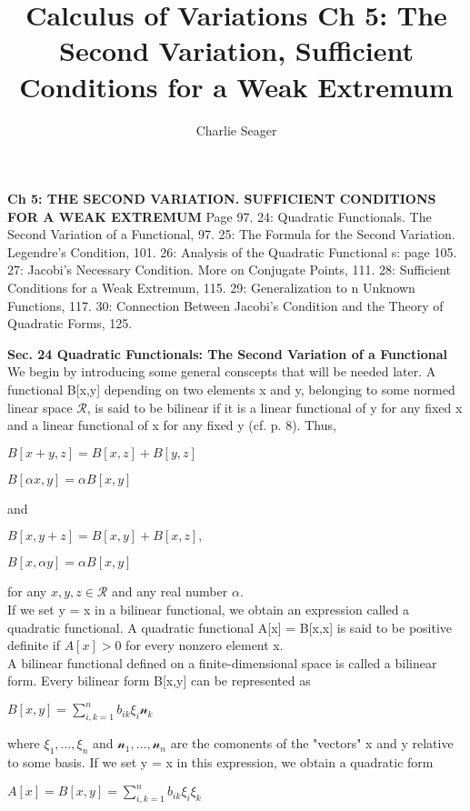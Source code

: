 \documentclass{article}
\begin{document}
\title {Calculus of Variations Ch 5: The Second Variation, Sufficient Conditions for a Weak Extremum}

\author{Charlie Seager}

\maketitle

\textbf {Ch 5: THE SECOND VARIATION. SUFFICIENT CONDITIONS FOR A WEAK EXTREMUM} Page 97. 24: Quadratic Functionals. The Second Variation of a Functional, 97. 25: The Formula for the Second Variation. Legendre's Condition, 101. 26: Analysis of the Quadratic Functional s: page 105. 27: Jacobi's Necessary Condition. More on Conjugate Points, 111. 28: Sufficient Conditions for a Weak Extremum, 115. 29: Generalization to n Unknown Functions, 117. 30: Connection Between Jacobi's Condition and the Theory of Quadratic Forms, 125.

\textbf {Sec. 24 Quadratic Functionals: The Second Variation of a Functional} \\ We begin by introducing some general conscepts that will be needed later. A functional B[x,y] depending on two elements x and y, belonging to some normed linear space $\mathcal{R}$, is said to be bilinear if it is a linear functional of y for any fixed x and a linear functional of x for any fixed y (cf. p. 8). Thus,
\begin{center}
$B[x + y, z] = B[x, z] + B[y,z]$
\end{center}
\begin{center}
$B[\alpha x, y] = \alpha B[x,y]$
\end{center}
and
\begin{center}
$B[x, y + z] = B[x,y] + B[x,z],$
\end{center}
\begin{center}
$B[x, \alpha y] = \alpha B[x,y]$
\end{center}
for any $x, y, z \in \mathcal{R}$ and any real number $\alpha$. \\
If we set y = x in a bilinear functional, we obtain an expression called a quadratic functional. A quadratic functional A[x] = B[x,x] is said to be positive definite if $A[x] > 0$ for every nonzero element x.\\ A bilinear functional defined on a finite-dimensional space is called a bilinear form. Every bilinear form B[x,y] can be represented as
\begin{center}
$B[x,y] = \sum_{i, k = 1}^n b_{ik} \xi_i \mathcal{n}_k$
\end{center}
where $\xi_1 ,..., \xi_n$ and $\mathcal{n}_1 ,..., \mathcal{n}_n$ are the comonents of the "vectors" x and y relative to some basis. If we set y = x in this expression, we obtain a quadratic form
\begin{center}
$A[x] = B[x,y] = \sum_{i, k=1}^n b_{ik} \xi_i \xi_k$
\end{center}
\end{document}
